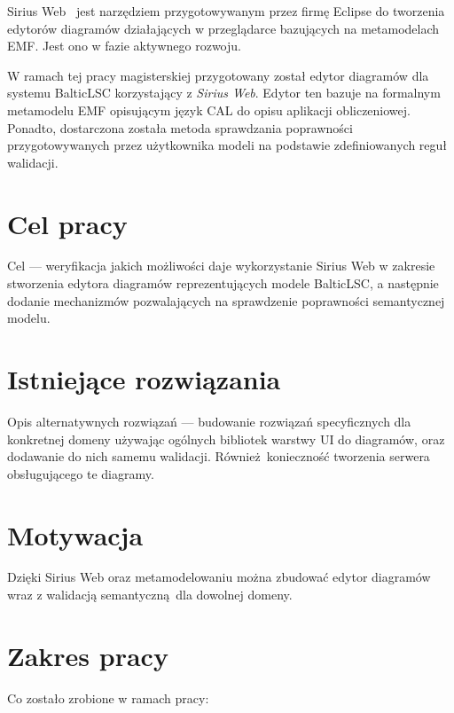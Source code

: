 Sirius Web~\cite{sirius-web-github} jest narzędziem przygotowywanym przez firmę
Eclipse do tworzenia edytorów
diagramów działających w przeglądarce bazujących na metamodelach \gls{EMF}.
Jest ono w fazie aktywnego rozwoju.

W ramach tej pracy magisterskiej przygotowany został edytor diagramów dla
systemu BalticLSC korzystający z \emph{Sirius Web}. Edytor ten bazuje na
formalnym metamodelu \gls{EMF} opisującym język \gls{CAL} do
opisu aplikacji obliczeniowej. Ponadto, dostarczona została metoda sprawdzania
poprawności przygotowywanych przez użytkownika modeli na podstawie
zdefiniowanych reguł walidacji.

\section{Cel pracy}

Cel --- weryfikacja jakich możliwości daje wykorzystanie Sirius Web w zakresie
stworzenia edytora diagramów reprezentujących modele BalticLSC, a następnie
dodanie mechanizmów pozwalających na sprawdzenie poprawności semantycznej
modelu.

\section{Istniejące rozwiązania}

Opis alternatywnych rozwiązań --- budowanie rozwiązań specyficznych dla
konkretnej domeny używając ogólnych bibliotek warstwy UI do diagramów, oraz
dodawanie do nich samemu walidacji. Również konieczność tworzenia serwera
obsługującego te diagramy.

\section{Motywacja}

Dzięki Sirius Web oraz metamodelowaniu można zbudować edytor diagramów wraz z
walidacją semantyczną dla dowolnej domeny.

\section{Zakres pracy}

Co zostało zrobione w ramach pracy:

